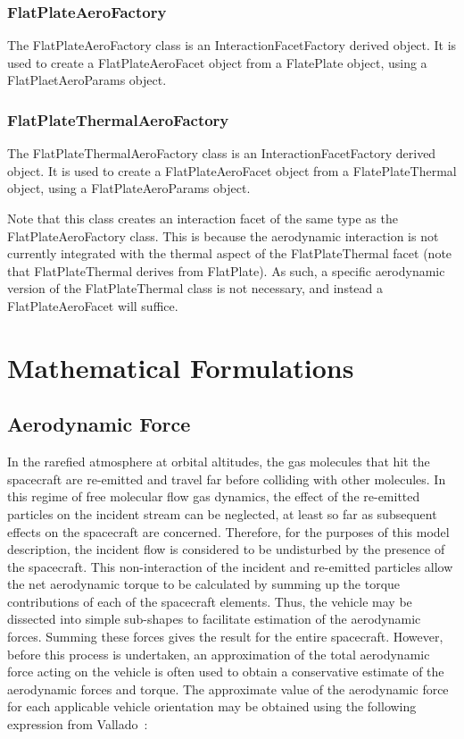 \subsubsection{FlatPlateAeroFactory}

The FlatPlateAeroFactory class is an InteractionFacetFactory derived
\cite{dynenv:SURFACEMODEL} object.
It is used to create a FlatPlateAeroFacet object from a FlatePlate \cite{dynenv:SURFACEMODEL}
object, using a FlatPlaetAeroParams object.

\subsubsection{FlatPlateThermalAeroFactory}

The FlatPlateThermalAeroFactory class is an InteractionFacetFactory derived
\cite{dynenv:SURFACEMODEL} object.
It is used to create a FlatPlateAeroFacet object from a FlatePlateThermal \cite{dynenv:SURFACEMODEL}
object, using a FlatPlateAeroParams object.

Note that this class creates
an interaction facet of the same type as the
FlatPlateAeroFactory class. This is because the aerodynamic interaction
is not currently integrated with the thermal aspect of the
FlatPlateThermal facet (note that FlatPlateThermal derives from
FlatPlate). As such, a specific aerodynamic version of the
FlatPlateThermal class is not necessary, and instead a FlatPlateAeroFacet
will suffice.

\section{Mathematical Formulations}

\subsection{Aerodynamic Force}
In the rarefied atmosphere at orbital altitudes, the gas molecules that hit
the spacecraft are re-emitted and travel far before colliding with other
molecules.  In this regime of free molecular flow gas dynamics, the effect
of the re-emitted particles on the incident stream can be neglected, at least
so far as subsequent effects on the spacecraft are concerned.  Therefore, for
the purposes of this model description, the incident flow is considered to be
undisturbed by the presence of the spacecraft.  This non-interaction of the
incident and re-emitted particles allow the net aerodynamic torque to be
calculated by summing up the torque contributions of each of the spacecraft
elements. Thus, the vehicle may be dissected into simple sub-shapes to
facilitate estimation of the aerodynamic forces.  Summing these forces gives
the result for the entire spacecraft.  However, before this process is
undertaken, an approximation of the total aerodynamic force acting on the
vehicle is often used to obtain a conservative estimate of the aerodynamic
forces and torque. The approximate value of the aerodynamic force for each
applicable vehicle orientation may be obtained using the following expression from
Vallado~\cite{VMcC}:

